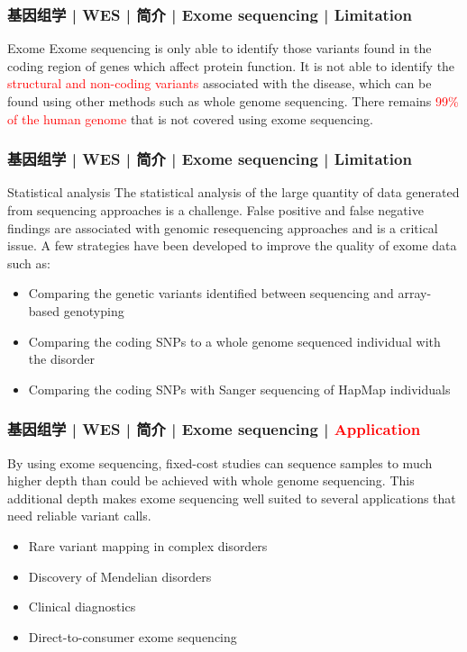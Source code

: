\begin{frame}
  \frametitle{基因组学 | WES | 简介 | Exome sequencing | Limitation}
  \begin{block}{Exome}
    Exome sequencing is only able to identify those variants found in the coding region of genes which affect protein function. It is not able to identify the \textcolor{red}{structural and non-coding variants} associated with the disease, which can be found using other methods such as whole genome sequencing. There remains \textcolor{red}{99\% of the human genome} that is not covered using exome sequencing.
  \end{block}
\end{frame}

\begin{frame}
  \frametitle{基因组学 | WES | 简介 | Exome sequencing | Limitation}
  \begin{block}{Statistical analysis}
    The statistical analysis of the large quantity of data generated from sequencing approaches is a challenge. False positive and false negative findings are associated with genomic resequencing approaches and is a critical issue. A few strategies have been developed to improve the quality of exome data such as:
    \begin{itemize}
      \item Comparing the genetic variants identified between sequencing and array-based genotyping
      \item Comparing the coding SNPs to a whole genome sequenced individual with the disorder
      \item Comparing the coding SNPs with Sanger sequencing of HapMap individuals
    \end{itemize}
  \end{block}
\end{frame}

\begin{frame}
  \frametitle{基因组学 | WES | 简介 | Exome sequencing | \textcolor{red}{Application}}
  By using exome sequencing, fixed-cost studies can sequence samples to much higher depth than could be achieved with whole genome sequencing. This additional depth makes exome sequencing well suited to several applications that need reliable variant calls.
  \begin{itemize}
    \item Rare variant mapping in complex disorders
    \item Discovery of Mendelian disorders
    \item Clinical diagnostics
    \item Direct-to-consumer exome sequencing
  \end{itemize}
\end{frame}


